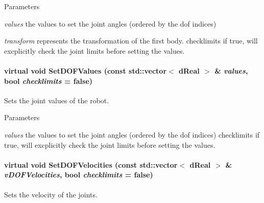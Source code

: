 \begin{DoxyParams}{Parameters}
\item[{\em values}]the values to set the joint angles (ordered by the dof indices) \item[{\em transform}]represents the transformation of the first body.  checklimits if true, will excplicitly check the joint limits before setting the values. \end{DoxyParams}
\hypertarget{classOpenRAVE_1_1KinBody_a30ca49e63e7794762a374f53585d3b8e}{
\paragraph[{SetDOFValues}]{\setlength{\rightskip}{0pt plus 5cm}virtual void SetDOFValues (const std::vector$<$ dReal $>$ \& {\em values}, \/  bool {\em checklimits} = {\ttfamily false})}\hfill}
\label{classOpenRAVE_1_1KinBody_a30ca49e63e7794762a374f53585d3b8e}


Sets the joint values of the robot. 


\begin{DoxyParams}{Parameters}
\item[{\em values}]the values to set the joint angles (ordered by the dof indices)  checklimits if true, will excplicitly check the joint limits before setting the values. \end{DoxyParams}
\hypertarget{classOpenRAVE_1_1KinBody_a0718b6336d442f3e2320f7b17d84d516}{
\paragraph[{SetDOFVelocities}]{\setlength{\rightskip}{0pt plus 5cm}virtual void SetDOFVelocities (const std::vector$<$ dReal $>$ \& {\em vDOFVelocities}, \/  bool {\em checklimits} = {\ttfamily false})}\hfill}
\label{classOpenRAVE_1_1KinBody_a0718b6336d442f3e2320f7b17d84d516}


Sets the velocity of the joints. 

